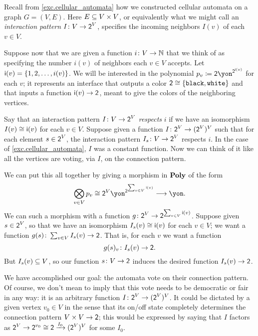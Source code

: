 \documentclass[DynamicalBook]{subfiles}
\begin{document}
\begin{example}\label{ex.cell_auto_vote_interaction}
Recall from \cref{exc.cellular_automata} how we constructed cellular automata on a graph $G=(V,E)$. Here $E\ss V\times V$, or equivalently what we might call an \emph{interaction pattern} $I\colon V\to \2^V$, specifies the incoming neighbors $I(v)$ of each $v\in V$.

Suppose now that we are given a function $i\colon V\to\nn$ that we think of as specifying the number $i(v)$ of neighbors each $v\in V$ accepts. Let $\ord{i}(v)=\{1,2,\ldots, i(v)\}$. We will be interested in the polynomial $p_v\coloneqq\2\yon^{\2^{\ord{i}(v)}}$ for each $v$; it represents an interface that outputs a color $\2\cong\{\const{black},\const{white}\}$ and that inputs a function $\ord{i}(v)\to\2$, meant to give the colors of the neighboring vertices.

Say that an interaction pattern $I\colon V\to\2^V$ \emph{respects} $i$ if we have an isomorphism $I(v)\cong\ord{i}(v)$ for each $v\in V$. Suppose given a function $I\colon \2^V\to (\2^V)^V$ such that for each element $s\in\2^V$, the interaction pattern $I_s\colon V\to \2^V$ respects $i$. In the case of \cref{exc.cellular_automata}, $I$ was a constant function. Now we can think of it like all the vertices are voting, via $I$, on the connection pattern. 

We can put this all together by giving a morphism in $\poly$ of the form
\begin{equation}\label{eqn.polymap_misc9237}
\bigotimes_{v\in V}p_v\cong\2^V\yon^{\2^{\sum_{v\in V}\ord{i}(v)}}\too\yon.
\end{equation}
We can such a morphism with a function $g\colon \2^V\to\2^{\sum_{v\in V}\ord{i}(v)}$. Suppose given $s\in\2^V$, so that we have an isomorphism $I_s(v)\cong\ord{i}(v)$ for each $v\in V$; we want a function $g(s)\colon\sum_{v\in V}I_s(v)\to\2$. That is, for each $v$ we want a function
\[
g(s)_v\colon I_s(v)\to\2.
\]
But $I_s(v)\ss V$, so our function $s\colon V\to\2$ induces the desired function $I_s(v)\to\2$.

We have accomplished our goal: the automata vote on their connection pattern. Of course, we don't mean to imply that this vote needs to be democratic or fair in any way: it is an arbitrary function $I\colon \2^V\to(\2^V)^V$. It could be dictated by a given vertex $v_0\in V$ in the sense that its on/off state completely determines the connection pattern $V\times V\to \2$; this would be expressed by saying that $I$ factors as $\2^V\to\2^{v_0}\cong\2\To{I_0}(\2^V)^V$ for some $I_0$.
\end{example}
\end{document}

